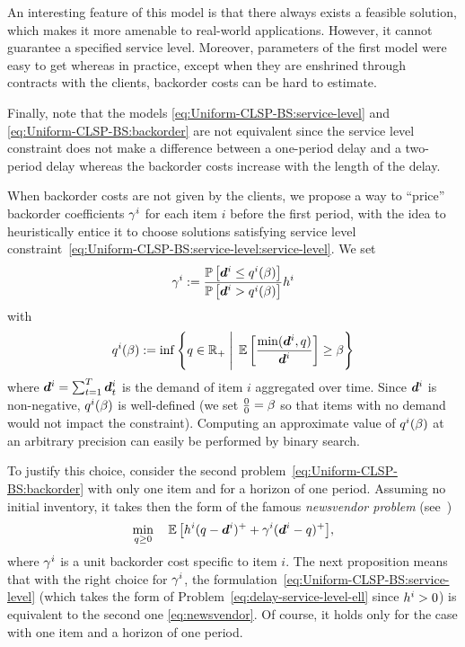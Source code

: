 An interesting feature of this model is that there always exists a feasible solution, which makes it more amenable to real-world applications.
However, it cannot guarantee a specified service level.
Moreover, parameters of the first model were easy to get whereas in practice, except when they are enshrined through contracts with the clients, backorder costs can be hard to estimate.


Finally, note that the models \eqref{eq:Uniform-CLSP-BS:service-level} and \eqref{eq:Uniform-CLSP-BS:backorder} are not equivalent since the service level constraint does not make a difference between a one-period delay and a two-period delay whereas the backorder costs increase with the length of the delay.


When backorder costs are not given by the clients, we propose a way to ``price'' backorder coefficients $\gamma^i$ for each item $i$ before the first period, with the idea to heuristically entice it to choose solutions satisfying service level constraint~\eqref{eq:Uniform-CLSP-BS:service-level:service-level}.
We set
\begin{equation}
\label{eq:delay-service-level-gamma}
\backorder^i := \frac{\prob\sqbracket{\va\demand^i \le q^i(\servicelvl)}}{\prob\sqbracket{\va\demand^i>q^i(\servicelvl)}} \holding^i
\end{equation}
with
\begin{equation}
\label{eq:delay-service-level-ell}
\quantity^i(\servicelvl) :=
\inf \crbracket{
  \quantity\in \RR_+ \; \Bigg| \; \espe\sqbracket{\frac{\min(\va\demand^i,\quantity)}{\va\demand^i}} \ge \servicelvl
}
\end{equation}
where $\va\demand^i = \sum_{t=1}^{\horizon} \va \demand_t^i$ is the demand of item $i$ aggregated over time.
Since $\va \demand^i$ is non-negative, $q^i(\beta)$ is well-defined
(we set $\frac{0}{0}=\beta$ so that items with no demand would not impact the constraint).
Computing an approximate value of $q^i(\beta)$ at an arbitrary precision can easily be performed by binary search.


To justify this choice, consider the second problem~\eqref{eq:Uniform-CLSP-BS:backorder} with only one item and for a horizon of one period.
Assuming no initial inventory, it takes then the form of the famous \emph{newsvendor problem} (see~\eg \citet[Chapter 1]{Shapiro2009})
\begin{equation}
\label{eq:newsvendor}
\min_{\quantity\ge 0} \quad \espe\sqbracket{\holding^i (\quantity - \va \demand^i )^+ + \backorder^i ( \va\demand^i - \quantity)^+},
\end{equation}
where $\gamma^i$ is a unit backorder cost specific to item $i$.
The next proposition means that with the right choice for $\gamma^i$, the formulation~\cref{eq:Uniform-CLSP-BS:service-level} (which takes the form of Problem~\eqref{eq:delay-service-level-ell} since $h^i>0$) is equivalent to the second one \eqref{eq:newsvendor}.
Of course, it holds only for the case with one item and a horizon of one period.


